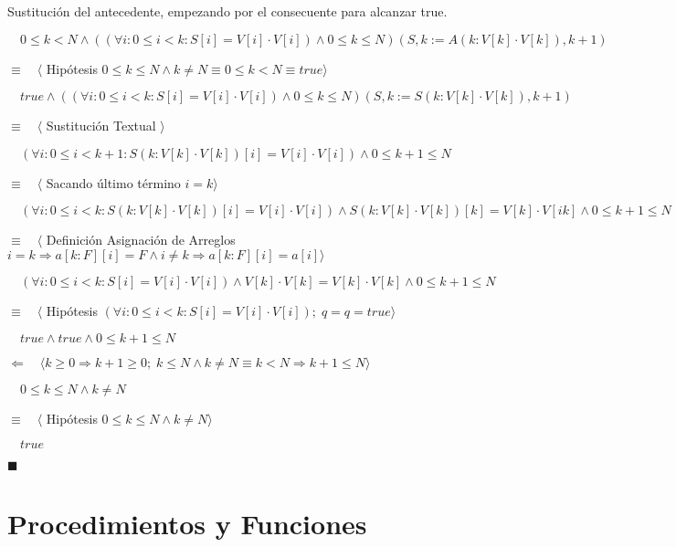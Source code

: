 \documentclass[hidelinks]{article}
\begin{document}
Sustitución del antecedente, empezando por el consecuente para alcanzar true.\par
$\quad 0 \leq k < N \land ((\forall i : 0 \leq i < k : S[i] = V[i] \cdot V[i]) \land 0 \leq k \leq N)(S, k := A(k : V[k] \cdot V[k]), k+1)$\par
$\equiv \quad \langle$ Hipótesis $ 0 \leq k \leq N \land k \neq N \equiv 0 \leq k < N \equiv true \rangle$\par
$\quad true \land ((\forall i : 0 \leq i < k : S[i] = V[i] \cdot V[i]) \land 0 \leq k \leq N)(S, k := S(k : V[k] \cdot V[k]), k+1)$\par
$\equiv \quad \langle$ Sustitución Textual $ \rangle$\par
$\quad (\forall i : 0 \leq i < k+1 : S(k : V[k] \cdot V[k])[i] = V[i] \cdot V[i]) \land 0 \leq k+1 \leq N$\par
$\equiv \quad \langle$ Sacando último término $ i = k \rangle$\par
$\quad (\forall i : 0 \leq i < k : S(k : V[k] \cdot V[k])[i] = V[i] \cdot V[i]) \land S(k : V[k] \cdot V[k])[k] = V[k] \cdot V[ik] \land 0 \leq k+1 \leq N$\par
$\equiv \quad \langle$ Definición Asignación de Arreglos ${ i = k \Rightarrow a[k : F][i] = F \land  i \neq k \Rightarrow a[k : F][i] = a[i] }\rangle$\par
$\quad (\forall i : 0 \leq i < k : S[i] = V[i] \cdot V[i]) \land V[k] \cdot V[k] = V[k] \cdot V[k] \land 0 \leq k+1 \leq N$\par
$\equiv \quad \langle$ Hipótesis $(\forall i : 0 \leq i < k : S[i] = V[i] \cdot V[i]); \; q=q=true\rangle$\par
$\quad true \land true \land 0 \leq k+1 \leq N$\par
$\Leftarrow \quad \langle k \geq 0 \Rightarrow k+1 \geq 0; \; k \leq N \land k \neq N \equiv k < N \Rightarrow k + 1 \leq N \rangle$\par
$\quad 0 \leq k \leq N \land k \neq N$\par
$\equiv \quad \langle$ Hipótesis $0 \leq k \leq N \land k \neq N\rangle$\par
$\quad true $\par
$\blacksquare$\par

\newpage

\section{Procedimientos y Funciones}
\end{document}
